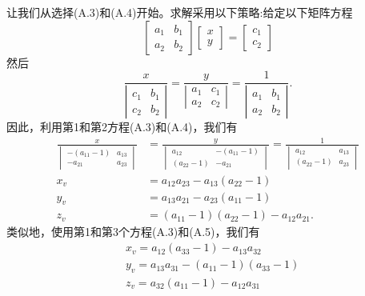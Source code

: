 让我们从选择(A.3)和(A.4)开始。求解采用以下策略:给定以下矩阵方程
$$
\left[\begin{array}{ll}
a_{1} & b_{1} \\
a_{2} & b_{2}
\end{array}\right]\left[\begin{array}{l}
x \\
y
\end{array}\right]=\left[\begin{array}{l}
c_{1} \\
c_{2}
\end{array}\right]
$$
然后
$$
\frac{x}{\left|\begin{array}{ll}
c_{1} & b_{1} \\
c_{2} & b_{2}
\end{array}\right|}=\frac{y}{\left|\begin{array}{ll}
a_{1} & c_{1} \\
a_{2} & c_{2}
\end{array}\right|}=\frac{1}{\left|\begin{array}{ll}
a_{1} & b_{1} \\
a_{2} & b_{2}
\end{array}\right|} .
$$
因此，利用第1和第2方程(A.3)和(A.4)，我们有
$$
\begin{aligned}
    \frac{x}{\begin{vmatrix}
        -(a_{11}-1) & a_{13} \\
        -a_{21} & a_{23}
        \end{vmatrix}}&=\frac{y}{\begin{vmatrix}
        a_{12} & -(a_{11}-1) \\
        (a_{22}-1) & -a_{21}
        \end{vmatrix}}=\frac{1}{\begin{vmatrix}
        a_{12} & a_{13} \\
        (a_{22}-1) & a_{23}
        \end{vmatrix}} \\
 x_{v}&=a_{12} a_{23}-a_{13}\left(a_{22}-1\right) \\
 y_{v}&=a_{13} a_{21}-a_{23}\left(a_{11}-1\right) \\
 z_{v}&=\left(a_{11}-1\right)\left(a_{22}-1\right)-a_{12} a_{21} .
\end{aligned}
$$
类似地，使用第1和第3个方程(A.3)和(A.5)，我们有
$$
\begin{aligned}
& x_{v}=a_{12}\left(a_{33}-1\right)-a_{13} a_{32} \\
& y_{v}=a_{13} a_{31}-\left(a_{11}-1\right)\left(a_{33}-1\right) \\
& z_{v}=a_{32}\left(a_{11}-1\right)-a_{12} a_{31}
\end{aligned}
$$
